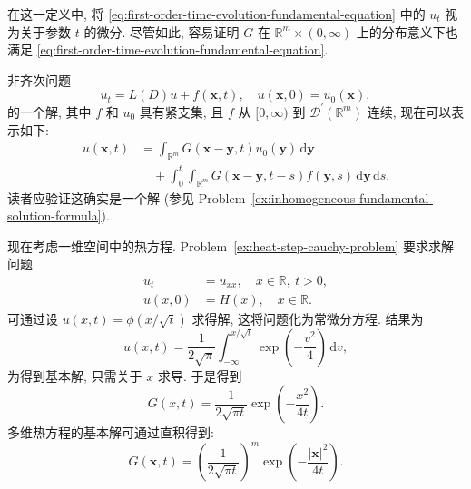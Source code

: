 在这一定义中, 将 \eqref{eq:first-order-time-evolution-fundamental-equation} 中的 $u_t$ 视为关于参数 $t$ 的微分. 尽管如此, 容易证明 $G$ 在 $\mathbb{R}^m\times(0,\infty)$ 上的分布意义下也满足 \eqref{eq:first-order-time-evolution-fundamental-equation}.

非齐次问题
\begin{equation}\label{eq:first-order-evolution-inhomogeneous-initial-problem}
u_t=L(D)u+f(\bm{x},t),\quad u(\bm{x},0)=u_0(\bm{x}),
\end{equation}
的一个解, 其中 $f$ 和 $u_0$ 具有紧支集, 且 $f$ 从 $[0,\infty)$ 到 $\mathcal{D}^{\prime}(\mathbb{R}^m)$ 连续, 现在可以表示如下:
\begin{equation}\label{eq:first-order-evolution-fundamental-solution-formula}
\begin{aligned}
u(\bm{x},t)&=\int_{\mathbb{R}^m}G(\bm{x}-\bm{y},t)u_0(\bm{y})\,\mathrm{d}\bm{y}\\
&\quad+\int_0^t\int_{\mathbb{R}^m}G(\bm{x}-\bm{y},t-s)f(\bm{y},s)\,\mathrm{d}\bm{y}\,\mathrm{d}s.
\end{aligned}
\end{equation}
读者应验证这确实是一个解 (参见 Problem~\ref{ex:inhomogeneous-fundamental-solution-formula}).

现在考虑一维空间中的热方程. Problem~\ref{ex:heat-step-cauchy-problem} 要求求解问题
\begin{equation}\label{eq:heat-equation-heaviside-initial-problem}
\begin{aligned}
u_t&=u_{xx},\quad x\in\mathbb{R},\ t>0,\\
u(x,0)&=H(x),\quad x\in\mathbb{R}.
\end{aligned}
\end{equation}
可通过设 $u(x,t)=\phi(x/\sqrt t)$ 求得解, 这将问题化为常微分方程. 结果为
\begin{equation}\label{eq:heat-heaviside-initial-solution}
u(x,t)=\dfrac1{2\sqrt\pi}\int_{-\infty}^{x/\sqrt t}\exp\left(-\dfrac{v^2}4\right)\,\mathrm{d}v,
\end{equation}
为得到基本解, 只需关于 $x$ 求导. 于是得到
\begin{equation}\label{eq:heat-fundamental-solution-one-dimension}
G(x,t)=\dfrac1{2\sqrt{\pi t}}\exp\left(-\dfrac{x^2}{4t}\right).
\end{equation}
多维热方程的基本解可通过直积得到:
\begin{equation}\label{eq:heat-fundamental-solution-multiple-dimensions}
G(\bm{x},t)=\left(\dfrac1{2\sqrt{\pi t}}\right)^m\exp\left(-\dfrac{|\bm{x}|^2}{4t}\right).
\end{equation}

